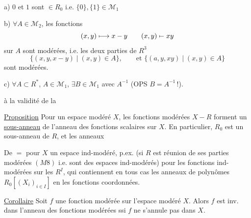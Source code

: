 
a) $0$ et $1$ sont $\in R_0$ i.e. $\{0\},\{1\}\in\mathcal M_1$

b) $\forall A\in\mathcal M_2$, les fonctions
\[
 (x,y)\longmapsto x-y\qquad
 (x,y)\mathrel{\mapstochar\relbar}xy
\]
sur $A$ sont modérées,  i.e. les deux parties de $R^3$
\[
 \{(x,y,x-y)\mid(x,y)\in A\},\qquad\text{et }\{(a,y,xy)\mid(x,y)\in A\}
\]
sont modérées.

c) $\forall A\subset R^*$, $A\in\mathcal M_1$, $\exists B\in\mathcal M_1$ avec $A^{-1}$  (OPS $B=A^{-1}$\,!).

    à la validité de la


\uline{Proposition} Pour un espace modéré $X$, les fonctions modérées $X\mathbin{-}R$  forment un \uline{sous-anneau} de l'anneau des fonctions scalaires sur $X$. En particulier, $R_0$ est un sous-anneau de $R$, et les anneaux

De $=$ pour $X$ un espace ind-modéré, p.ex. (si $R$ est réunion  de ses parties modérées $(M8)$ i.e.  sont des espaces ind-modérés) pour les fonctions ind-modérées sur les $R^I$, qui contiennent en tous cas les  anneaux de polynômes $R_0[(X_i)_{i\in I}]$ en les fonctions coordonnées.


\uline{Corollaire} Soit $f$ une fonction modérée sur l'espace modéré $X$. Alors $f$ est inv. dans l'anneau des fonctions modérées ssi $f$ ne s'annule pas dans $X$.

